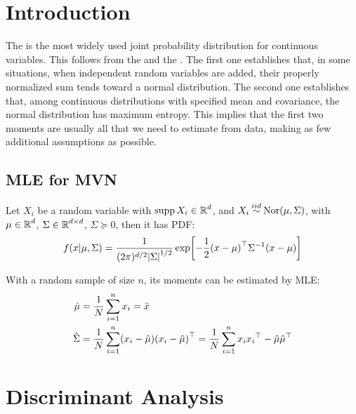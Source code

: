 
\section{Introduction}

The  is the most widely used joint probability distribution for continuous variables. This follows from the  and the . The first one establishes that, in some situations, when independent random variables are added, their properly normalized sum tends toward a normal distribution. The second one establishes that, among continuous distributions with specified mean and covariance, the normal distribution has maximum entropy. This implies that the first two moments are usually all that we need to estimate from data, making as few additional assumptions as possible.

\subsection{MLE for MVN}
Let $X_i$ be a random variable with $\operatorname{supp}{X_i}\in\operatorname{\mathbb{R}}^d$, and $X_i\dist{iid}\text{Nor}(\mu,\Sigma)$, with $\mu\in\operatorname{\mathbb{R}}^d$, $\Sigma\in\operatorname{\mathbb{R}}^{d\times d}$, $\Sigma\succeq 0$, then it has PDF:
\begin{equation*}
    f(x|\mu,\Sigma) = \frac{1}{(2\pi)^{d/2}\abs{\Sigma}^{1/2}}\exp[-\frac{1}{2}{(x-\mu)}^\top{\Sigma}^{-1}(x-\mu) ]
\end{equation*}

With a random sample of size $n$, its moments can be estimated by MLE:
\begin{align*}
    \hat{\mu} &= \frac{1}{N}\sum_{i=1}^nx_i = \bar{x}\\
    \hat{\Sigma} &= \frac{1}{N}\sum_{i=1}^n (x_i-\hat{\mu}){(x_i-\hat{\mu})}^\top = \frac{1}{N}\sum_{i=1}^n x_i{x_i}^\top-\hat{\mu}{\hat{\mu}}^\top
\end{align*}


\section{Discriminant Analysis}

